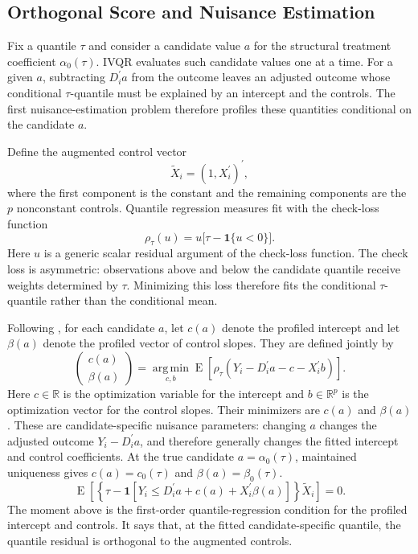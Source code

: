 \subsection{Orthogonal Score and Nuisance Estimation}

Fix a quantile $\tau$ and consider a candidate value $a$ for the structural treatment coefficient $\alpha_0(\tau)$. IVQR evaluates such candidate values one at a time. For a given $a$, subtracting $D_i^{\prime}a$ from the outcome leaves an adjusted outcome whose conditional $\tau$-quantile must be explained by an intercept and the controls. The first nuisance-estimation problem therefore profiles these quantities conditional on the candidate $a$.

Define the augmented control vector
\[
    \widetilde X_i=(1,X_i^{\prime})^{\prime},
\]
where the first component is the constant and the remaining components are the $p$ nonconstant controls. Quantile regression measures fit with the check-loss function
\begin{equation}
    \rho_{\tau}(u)
    = u\bigl[\tau-\mathbf{1}\{u<0\}\bigr].
    \label{eq:check-loss}
\end{equation}
Here $u$ is a generic scalar residual argument of the check-loss function. The check loss is asymmetric: observations above and below the candidate quantile receive weights determined by $\tau$. Minimizing this loss therefore fits the conditional $\tau$-quantile rather than the conditional mean.

Following \textcite{chen_huang_tien_2021}, for each candidate $a$, let $c(a)$ denote the profiled intercept and let $\beta(a)$ denote the profiled vector of control slopes. They are defined jointly by
\begin{equation}
    \begin{pmatrix}
        c(a)\\
        \beta(a)
    \end{pmatrix}
    = \operatorname*{arg\,min}_{c,b}
      \operatorname{E}\!\left[
          \rho_{\tau}\!\left(Y_i-D_i^{\prime}a-c-X_i^{\prime}b\right)
      \right].
    \label{eq:profile-beta}
\end{equation}
Here $c\in\mathbb{R}$ is the optimization variable for the intercept and $b\in\mathbb{R}^{p}$ is the optimization vector for the control slopes. Their minimizers are $c(a)$ and $\beta(a)$. These are candidate-specific nuisance parameters: changing $a$ changes the adjusted outcome $Y_i-D_i^{\prime}a$, and therefore generally changes the fitted intercept and control coefficients. At the true candidate $a=\alpha_0(\tau)$, maintained uniqueness gives $c(a)=c_0(\tau)$ and $\beta(a)=\beta_0(\tau)$.
\begin{equation}
    \operatorname{E}\!\left[
        \left\{
            \tau-\mathbf{1}\!\left[
                Y_i\leq D_i^{\prime}a+c(a)+X_i^{\prime}\beta(a)
            \right]
        \right\}\widetilde X_i
    \right]
    =0.
    \label{eq:profile-beta-moment}
\end{equation}
The moment above is the first-order quantile-regression condition for the profiled intercept and controls. It says that, at the fitted candidate-specific quantile, the quantile residual is orthogonal to the augmented controls.

